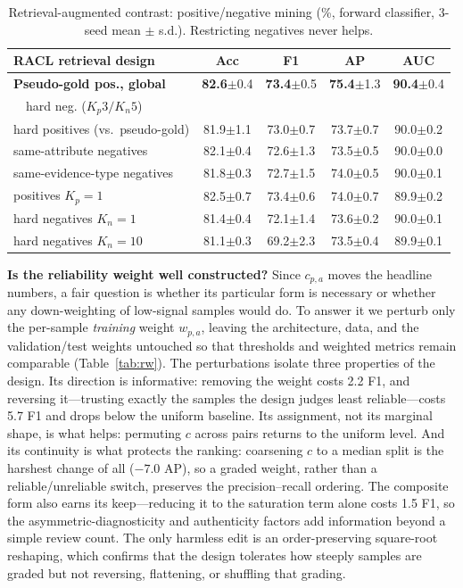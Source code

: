 \documentclass[letterpaper]{article}
\newcommand{\best}[1]{\textbf{#1}}
\newcommand{\std}[1]{{\scriptsize$\pm$#1}}
\begin{document}
\begin{table}[t]
\centering\small
\setlength{\tabcolsep}{5pt}
\begin{tabular}{lcccc}
\toprule
RACL retrieval design & Acc & F1 & AP & AUC \\
\midrule
\textbf{Pseudo-gold pos., global} & \best{82.6}\std{0.4} & \best{73.4}\std{0.5} & \best{75.4}\std{1.3} & \best{90.4}\std{0.4} \\
\ \ hard neg. ($K_p3/K_n5$) & & & & \\
hard positives (vs.\ pseudo-gold) & 81.9\std{1.1} & 73.0\std{0.7} & 73.7\std{0.7} & 90.0\std{0.2} \\
same-attribute negatives & 82.1\std{0.4} & 72.6\std{1.3} & 73.5\std{0.5} & 90.0\std{0.0} \\
same-evidence-type negatives & 81.8\std{0.3} & 72.7\std{1.5} & 74.0\std{0.5} & 90.0\std{0.1} \\
positives $K_p{=}1$ & 82.5\std{0.7} & 73.4\std{0.6} & 74.0\std{0.7} & 89.9\std{0.2} \\
hard negatives $K_n{=}1$ & 81.4\std{0.4} & 72.1\std{1.4} & 73.6\std{0.2} & 90.0\std{0.1} \\
hard negatives $K_n{=}10$ & 81.1\std{0.3} & 69.2\std{2.3} & 73.5\std{0.4} & 89.9\std{0.1} \\
\bottomrule
\end{tabular}
\caption{Retrieval-augmented contrast: positive/negative mining (\%, forward classifier, 3-seed mean $\pm$ s.d.). Restricting negatives never helps.}
\label{tab:abl_ret}
\end{table}

\textbf{Is the reliability weight well constructed?} Since $c_{p,a}$ moves the headline numbers, a fair question is whether its particular form is necessary or whether any down-weighting of low-signal samples would do. To answer it we perturb only the per-sample \emph{training} weight $w_{p,a}$, leaving the architecture, data, and the validation/test weights untouched so that thresholds and weighted metrics remain comparable (Table~\ref{tab:rw}). The perturbations isolate three properties of the design. Its direction is informative: removing the weight costs 2.2 F1, and reversing it---trusting exactly the samples the design judges least reliable---costs 5.7 F1 and drops below the uniform baseline. Its assignment, not its marginal shape, is what helps: permuting $c$ across pairs returns to the uniform level. And its continuity is what protects the ranking: coarsening $c$ to a median split is the harshest change of all ($-7.0$ AP), so a graded weight, rather than a reliable/unreliable switch, preserves the precision--recall ordering. The composite form also earns its keep---reducing it to the saturation term alone costs 1.5 F1, so the asymmetric-diagnosticity and authenticity factors add information beyond a simple review count. The only harmless edit is an order-preserving square-root reshaping, which confirms that the design tolerates how steeply samples are graded but not reversing, flattening, or shuffling that grading.
\end{document}
